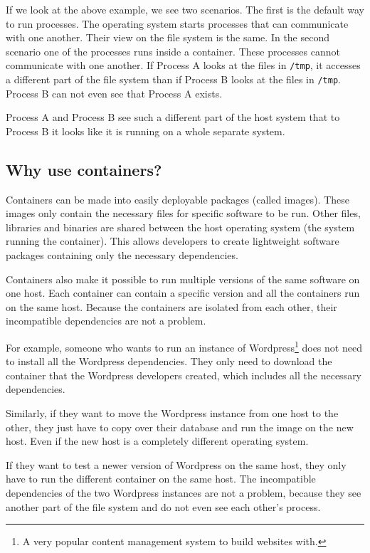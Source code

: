 If we look at the above example, we see two scenarios. The first is the default way to run processes. The operating system starts processes that can communicate with one another. Their view on the file system is the same.
In the second scenario one of the processes runs inside a container. These processes cannot communicate with one another. If Process A looks at the files in \lstinline{/tmp}, it accesses a different part of the file system than if Process B looks at the files in \lstinline{/tmp}. Process B can not even see that Process A exists.

\hfill

Process A and Process B see such a different part of the host system that to Process B it looks like it is running on a whole separate system.

\subsection{Why use containers?}

Containers can be made into easily deployable packages (called images). These images only contain the necessary files for specific software to be run. Other files, libraries and binaries are shared between the host operating system (the system running the container). This allows developers to create lightweight software packages containing only the necessary dependencies.

\hfill

Containers also make it possible to run multiple versions of the same software on one host. Each container can contain a specific version and all the containers run on the same host. Because the containers are isolated from each other, their incompatible dependencies are not a problem.

\hfill

For example, someone who wants to run an instance of Wordpress\footnote{A very popular content management system to build websites with.} does not need to install all the Wordpress dependencies. They only need to download the container that the Wordpress developers created, which includes all the necessary dependencies.

Similarly, if they want to move the Wordpress instance from one host to the other, they just have to copy over their database and run the image on the new host. Even if the new host is a completely different operating system.

If they want to test a newer version of Wordpress on the same host, they only have to run the different container on the same host. The incompatible dependencies of the two Wordpress instances are not a problem, because they see another part of the file system and do not even see each other's process.

